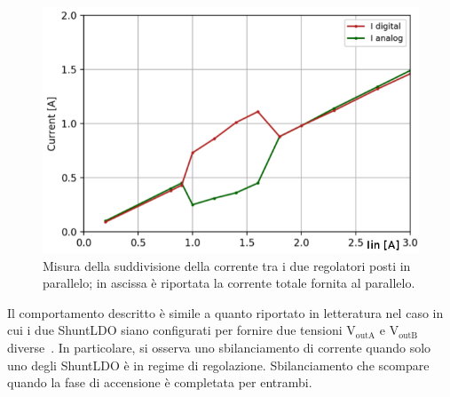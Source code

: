 % 
%

\begin{figure}
\centering
\includegraphics[scale=.4]{Immagini/CurrentSharingbis}
\caption{Misura della suddivisione della corrente tra i due regolatori posti in parallelo; in ascissa è riportata la corrente totale fornita al parallelo.}%
\label{CurrentSharing}
\end{figure}
Il comportamento descritto è simile a quanto riportato in letteratura nel caso in cui i due ShuntLDO siano configurati per fornire due tensioni $\mathrm{V_{outA}}$ e $\mathrm{V_{outB}}$ diverse~\cite{SLDO}. In particolare, si osserva uno sbilanciamento di corrente quando solo uno degli ShuntLDO \`e in regime di regolazione. Sbilanciamento che scompare quando la fase di accensione \`e completata per entrambi.
 


